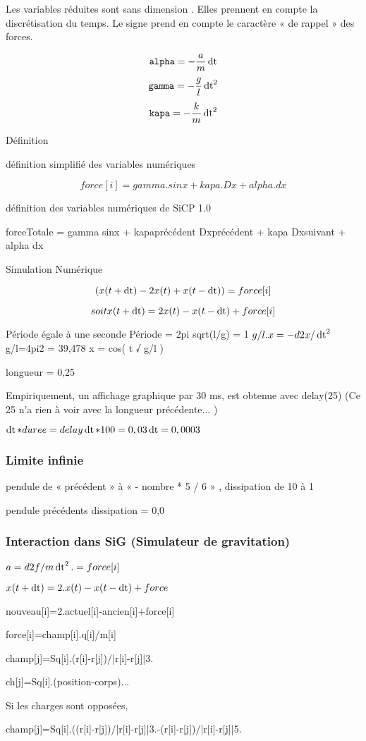 Les variables réduites sont sans dimension . Elles prennent en compte la discrétisation du temps. Le signe prend en compte le caractère « de rappel » des forces.

\[
\texttt{alpha} =  - \frac{a}{m}\operatorname{dt}
\]
\[
\texttt{gamma} =  - \frac{g}{l}\operatorname{dt}^2
\]
\[
\texttt{kapa} =  - \frac{k}{m}\operatorname{dt}^2
\]

Définition

définition simplifié des variables numériques

\[
force[i] = gamma.sinx + kapa.Dx + alpha.dx
\]

définition des variables numériques de SiCP 1.0

forceTotale = gamma sinx + kapaprécédent  Dxprécédent +  kapa Dxsuivant + alpha dx

Simulation Numérique


\[
	( x(t+\operatorname{dt}) - 2x(t) + x(t-\operatorname{dt}) ) = force[i]
\]

\[
	soit	x(t+\operatorname{dt}) = 2 x(t) - x(t-\operatorname{dt}) + force[i]
\]


Période égale à une seconde
		Période = 2pi sqrt(l/g) = 1			$g/l . x = - d2x / \operatorname{dt}^2 $
		g/l=4pi2 = 39,478				x = cos( t √ g/l )

				longueur = 0,25

Empiriquement, un affichage graphique par 30 ms, est obtenue avec delay(25)
 (Ce 25 n'a rien à voir avec la longueur précédente... )

		$\operatorname{dt} * duree = delay
		\operatorname{dt} * 100 = 0,03 		\operatorname{dt} = 0,0003$


\subsubsection{Limite infinie}

	pendule de  « précédent »  à  « - nombre * 5 / 6 » ,
		dissipation de 10  à 1 

	pendule précédents
		dissipation = 0,0



\subsubsection{Interaction dans SiG (Simulateur de gravitation)}

	$a=d2f/m\operatorname{dt}^2.=force[i]$

$x(t+\operatorname{dt})=2.x(t)-x(t-\operatorname{dt})+force$

nouveau[i]=2.actuel[i]-ancien[i]+force[i]

force[i]=champ[i].q[i]/m[i]

champ[j]=Sq[i].(r[i]-r[j])/|r[i]-r[j]|3.

ch[j]=Sq[i].(position-corps)...

Si les charges sont opposées,

	champ[j]=Sq[i].((r[i]-r[j])/|r[i]-r[j]|3.-(r[i]-r[j])/|r[i]-r[j]|5.



